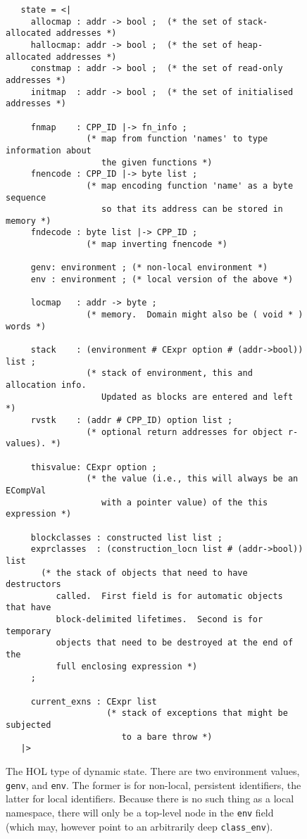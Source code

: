 \documentclass[11pt]{article}
\begin{document}
\begin{figure}[htbp]
\footnotesize
\begin{verbatim}
   state = <|
     allocmap : addr -> bool ;  (* the set of stack-allocated addresses *)
     hallocmap: addr -> bool ;  (* the set of heap-allocated addresses *)
     constmap : addr -> bool ;  (* the set of read-only addresses *)
     initmap  : addr -> bool ;  (* the set of initialised addresses *)

     fnmap    : CPP_ID |-> fn_info ;
                (* map from function 'names' to type information about
                   the given functions *)
     fnencode : CPP_ID |-> byte list ;
                (* map encoding function 'name' as a byte sequence
                   so that its address can be stored in memory *)
     fndecode : byte list |-> CPP_ID ;
                (* map inverting fnencode *)

     genv: environment ; (* non-local environment *)
     env : environment ; (* local version of the above *)

     locmap   : addr -> byte ;
                (* memory.  Domain might also be ( void * ) words *)

     stack    : (environment # CExpr option # (addr->bool)) list ;
                (* stack of environment, this and allocation info.
                   Updated as blocks are entered and left *)
     rvstk    : (addr # CPP_ID) option list ;
                (* optional return addresses for object r-values). *)

     thisvalue: CExpr option ;
                (* the value (i.e., this will always be an ECompVal
                   with a pointer value) of the this expression *)

     blockclasses : constructed list list ;
     exprclasses  : (construction_locn list # (addr->bool)) list
       (* the stack of objects that need to have destructors
          called.  First field is for automatic objects that have
          block-delimited lifetimes.  Second is for temporary
          objects that need to be destroyed at the end of the
          full enclosing expression *)
     ;

     current_exns : CExpr list
                    (* stack of exceptions that might be subjected
                       to a bare throw *)
   |>
\end{verbatim}
\caption[The HOL Type of Dynamic State]{The HOL type of dynamic state.
  There are two environment values, \texttt{genv}, and \texttt{env}.
  The former is for non-local, persistent identifiers, the latter for
  local identifiers.  Because there is no such thing as a local
  namespace, there will only be a top-level node in the \texttt{env}
  field (which may, however point to an arbitrarily deep
  \texttt{class_env}).}
\label{fig:state-type}
\end{figure}
\end{document}
